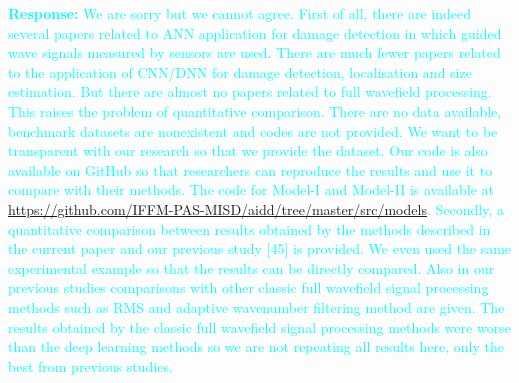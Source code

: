 \documentclass[11pt,a2paper]{report}
\begin{document}
	\textcolor{Cyan}{
		\textbf{Response:}
	We are sorry but we cannot agree. First of all, there are indeed several papers related to ANN application for damage detection in which guided wave signals measured by sensors are used. There are much fewer papers related to the application of CNN/DNN for damage detection, localisation and size estimation. But there are almost no papers related to full wavefield processing. This raises the problem of quantitative comparison. There are no data available, benchmark datasets are nonexistent and codes are not provided.
	We want to be transparent with our research so that we provide the dataset. Our code is also available on GitHub so that researchers can reproduce the results and use it to compare with their methods. 
	The code for Model-I and Model-II is available at \url{https://github.com/IFFM-PAS-MISD/aidd/tree/master/src/models}.
	Secondly, a quantitative comparison between results obtained by the methods described in the current paper and our previous study [45] is provided. We even used the same experimental example so that the results can be directly compared. Also in our previous studies comparisons with other classic full wavefield signal processing methods such as RMS and adaptive wavenumber filtering method are given. The results obtained by the classic full wavefield signal processing methods were worse than the deep learning methods so we are not repeating all results here, only the best from previous studies.
	}

	\vspace{5mm}
	
\end{document}
